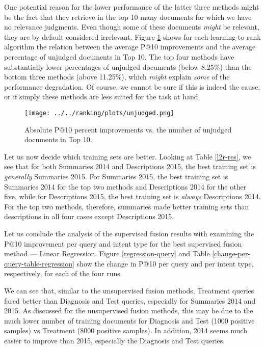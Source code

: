 One potential reason for the lower performance of the latter three methods might be the fact that they retrieve in the top 10
many documents for which we have no relevance judgments. Even though some of these documents \emph{might} be relevant,
they are by default considered irrelevant.
Figure \ref{unjudged-fig} shows for each learning to rank algorithm
the relation between the average P@10 improvements and the average
percentage of unjudged documents in Top 10. The top four methods
have substantially lower percentages of unjudged documents (below 8.25\%) than the bottom
three methods (above 11.25\%), which \emph{might} explain \emph{some} of the performance degradation.
Of course, we cannot
be sure if this is indeed the cause, or if simply these methods are less suited for the task at hand.

\begin{figure}
\centerline{
  \texttt{[image: ../../ranking/plots/unjudged.png]}
  }
  \caption{Absolute P@10 percent improvements vs. the number of unjudged documents in Top 10.}
  \label{unjudged-fig}
\end{figure}

Let us now decide which training sets are better.
Looking at Table \ref{l2r-res}, we see that for both Summaries 2014 and Descriptions 2015, the best
training set is \emph{generally} Summaries 2015.
For Summaries 2015, the best training set
is Summaries 2014 for the top two methods and Descriptions 2014 for the other five,
while for Descriptions 2015, the best training set is \emph{always} Descriptions 2014.
For the top two methods, therefore, summaries made better training sets than descriptions in all
four cases except Descriptions 2015.

Let us conclude the analysis of the supervised fusion results with examining the P@10 improvement per query
and intent type
for the best supervised fusion method --- Linear Regression. Figure \ref{regression-query} and Table
\ref{change-per-query-table-regression} show the change in P@10
per query and per intent type, respectively, for each of the four runs.

We can see that, similar to the unsupervised fusion methods,
Treatment queries fared better than Diagnosis and Test queries, especially for Summaries 2014 and 2015.
As discussed for the unsupervised fusion methods, this may be due to the much lower number of training
documents for Diagnosis and Test (1000 positive samples) vs Treatment (8000 positive samples).
In addition, 2014 seems much easier to improve than 2015, especially the Diagnosis and Test queries.


